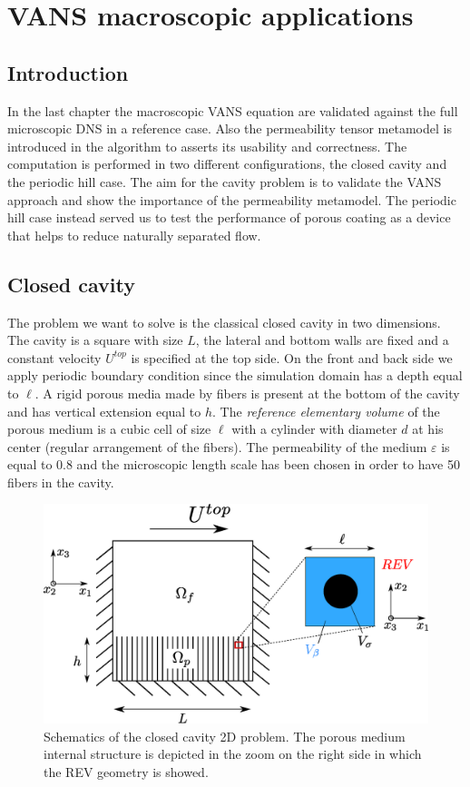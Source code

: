 \chapter{VANS macroscopic applications}


\section{Introduction}

In the last chapter the macroscopic VANS equation are validated against the full microscopic DNS in a reference case. Also the permeability tensor metamodel is introduced in the algorithm to asserts its usability and correctness. The computation is performed in two different configurations, the closed cavity and the periodic hill case. The aim for the cavity problem is to validate the VANS approach and show the importance of the permeability metamodel. The periodic hill case instead served us to test the performance of porous coating as a device that helps to reduce naturally separated flow.


\section{Closed cavity}
The problem we want to solve is the classical closed cavity in two dimensions.
The cavity is a square with size $L$, the lateral and bottom walls are fixed and a constant velocity $U^{top}$ is specified at the top side.
On the front and back side we apply periodic boundary condition since the simulation domain has a depth equal to $\ell$.
A rigid porous media made by fibers is present at the bottom of the cavity and has vertical extension equal to $h$.
The \textit{reference elementary volume} of the porous medium is a cubic cell of size $\ell$ with a cylinder with diameter $d$ at his center (regular arrangement of the fibers).
The permeability of the medium $\varepsilon$ is equal to 0.8 and the microscopic length scale has been chosen in order to have 50 fibers in the cavity.

\begin{figure}[h]
\centering
\includegraphics[width=0.7\linewidth]{chapter_5/figure/cavity_draw.eps}
\caption{Schematics of the closed cavity 2D problem. The porous medium internal structure is depicted in the zoom on the right side in which the REV geometry is showed.}
\label{fig:geom}
\end{figure}

